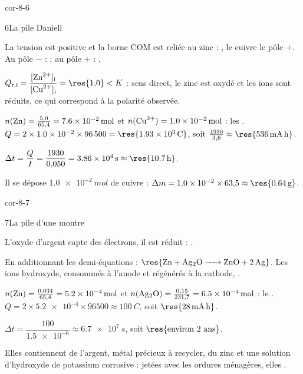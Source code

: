 \begin{blocLivre}{cor-8-6}
\begin{corrige}{6}{La pile Daniell}
\begin{questions}
\item La tension est positive et la borne COM est reliée au zinc : , le cuivre le pôle $+$.
Au pôle $-$ :  ; au pôle $+$ : .
\item $Q_{\mathrm{r},\mathrm{i}}=\dfrac{[\ce{Zn^2+}]_\mathrm{i}}{[\ce{Cu^2+}]_\mathrm{i}}=\res{1{,}0}<K$ : sens direct, le zinc est oxydé et les ions
 sont réduits, ce qui correspond à la polarité observée.
\item $n(\ce{Zn})=\frac{5{,}0}{65{,}4}=\qty{7,6e-2}{mol}$ et $n(\ce{Cu^2+})=\qty{1,0e-2}{mol}$ : les . $Q=2\times\num{1.0e-2}\times\num{96500}=\res{\qty{1,93e3}{C}}$, soit $\frac{1930}{3{,}6}\approx\res{\qty{536}{mA.h}}$.
\item $\Delta t=\dfrac{Q}{I}=\dfrac{1930}{0{,}050}=\qty{3,86e4}{s}\approx\res{\qty{10,7}{h}}$.
\item Il se dépose $\qty{1,0e-2}{mol}$ de cuivre : $\Delta m=\num{1.0e-2}\times63{,}5\approx\res{\qty{0,64}{g}}$.
\end{questions}
\end{corrige}
\end{blocLivre}
\begin{blocLivre}{cor-8-7}
\begin{corrige}{7}{La pile d'une montre}
\begin{questions}
\item L'oxyde d'argent capte des électrons, il est réduit : .
\item En additionnant les demi-équations : $\res{\ce{Zn + Ag2O -> ZnO + 2 Ag}}$. Les ions hydroxyde, consommés à l'anode
et régénérés à la cathode, .
\item $n(\ce{Zn})=\frac{0{,}034}{65{,}4}=\qty{5,2e-4}{mol}$ et $n(\ce{Ag2O})=\frac{0{,}15}{231{,}7}=\qty{6,5e-4}{mol}$ : le
. $Q=2\times\num{5.2e-4}\times\num{96500}\approx\qty{100}{C}$, soit $\res{\qty{28}{mA.h}}$.
\item $\Delta t=\dfrac{100}{\num{1.5e-6}}\approx\qty{6,7e7}{s}$, soit $\res{\text{environ 2 ans}}$.
\item Elles contiennent de l'argent, métal précieux à recycler, du zinc et une solution d'hydroxyde de potassium
corrosive : jetées avec les ordures ménagères, elles .
\end{questions}
\end{corrige}
\end{blocLivre}

